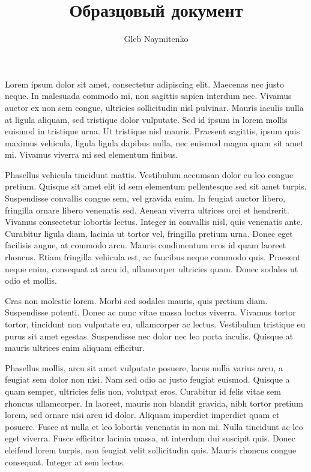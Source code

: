 \documentclass[a4paper,12pt]{article}
\title{Образцовый документ }
\author{Gleb Naymitenko}
\begin{document}

Lorem ipsum dolor sit amet, consectetur adipiscing elit. Maecenas nec justo neque. In malesuada commodo mi, non sagittis sapien interdum nec. Vivamus auctor ex non sem congue, ultricies sollicitudin nisl pulvinar. Mauris iaculis nulla at ligula aliquam, sed tristique dolor vulputate. Sed id ipsum in lorem mollis euismod in tristique urna. Ut tristique nisl mauris. Praesent sagittis, ipsum quis maximus vehicula, ligula ligula dapibus nulla, nec euismod magna quam sit amet mi. Vivamus viverra mi sed elementum finibus.

Phasellus vehicula tincidunt mattis. Vestibulum accumsan dolor eu leo congue pretium. Quisque sit amet elit id sem elementum pellentesque sed sit amet turpis. Suspendisse convallis congue sem, vel gravida enim. In feugiat auctor libero, fringilla ornare libero venenatis sed. Aenean viverra ultrices orci et hendrerit. Vivamus consectetur lobortis lectus. Integer in convallis nisl, quis venenatis ante. Curabitur ligula diam, lacinia ut tortor vel, fringilla pretium urna. Donec eget facilisis augue, at commodo arcu. Mauris condimentum eros id quam laoreet rhoncus. Etiam fringilla vehicula est, ac faucibus neque commodo quis. Praesent neque enim, consequat at arcu id, ullamcorper ultricies quam. Donec sodales ut odio et mollis.

Cras non molestie lorem. Morbi sed sodales mauris, quis pretium diam. Suspendisse potenti. Donec ac nunc vitae massa luctus viverra. Vivamus tortor tortor, tincidunt non vulputate eu, ullamcorper ac lectus. Vestibulum tristique eu purus sit amet egestas. Suspendisse nec dolor nec leo porta iaculis. Quisque at mauris ultrices enim aliquam efficitur.

Phasellus mollis, arcu sit amet vulputate posuere, lacus nulla varius arcu, a feugiat sem dolor non nisi. Nam sed odio ac justo feugiat euismod. Quisque a quam semper, ultricies felis non, volutpat eros. Curabitur id felis vitae sem rhoncus ullamcorper. In laoreet, mauris non blandit gravida, nibh tortor pretium lorem, sed ornare nisi arcu id dolor. Aliquam imperdiet imperdiet quam et posuere. Fusce at nulla et leo lobortis venenatis in non mi. Nulla tincidunt ac leo eget viverra. Fusce efficitur lacinia massa, ut interdum dui suscipit quis. Donec eleifend lorem turpis, non feugiat velit sollicitudin quis. Mauris rhoncus congue consequat. Integer at sem lectus.
\end{document}
